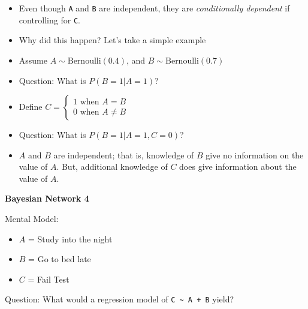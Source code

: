\documentclass[
]{article}
\providecommand{\tightlist}{%
  \setlength{\itemsep}{0pt}\setlength{\parskip}{0pt}}
\begin{document}
\begin{itemize}
\item
  Even though \texttt{A} and \texttt{B} are independent, they are
  \emph{conditionally dependent} if controlling for \texttt{C}.
\item
  Why did this happen? Let's take a simple example
\item
  Assume \(A\sim \text{Bernoulli}(0.4)\), and
  \(B\sim \text{Bernoulli}(0.7)\)
\item
  Question: What is \(P(B=1|A=1)\)?
\item
  Define
  \(C = \begin{cases} 1 \text{ when } A=B \\ 0 \text{ when } A\neq B\end{cases}\)
\item
  Question: What is \(P(B=1| A=1, C=0)\)?
\item
  \(A\) and \(B\) are independent; that is, knowledge of \(B\) give no
  information on the value of \(A\). But, additional knowledge of \(C\)
  does give information about the value of \(A\).
\end{itemize}

\textbf{Bayesian Network 4}

\hypertarget{htmlwidget-35e18a5c42075fe63654}{}
\begin{grViz}

\end{grViz}

Mental Model:

\begin{itemize}
\tightlist
\item
  \(A\) = Study into the night
\item
  \(B\) = Go to bed late
\item
  \(C\) = Fail Test
\end{itemize}

Question: What would a regression model of
\texttt{C\ \textasciitilde{}\ A\ +\ B} yield?
\end{document}
